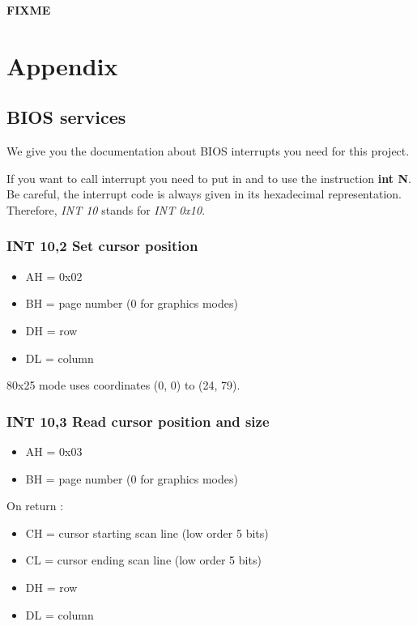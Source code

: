 \textbf{FIXME}


%
%

\chapter{Appendix}

%
%

\section{BIOS services}

We give you the documentation about BIOS interrupts you need for this
project.

If you want to call interrupt  you need to put  in
 and to use the instruction \textbf{int N}. Be careful, the
interrupt code is always given in its hexadecimal representation. Therefore,
\emph{INT 10} stands for \emph{INT 0x10}.

%
%
\subsection{INT 10,2 Set cursor position}
\begin{itemize}
  \item{AH = 0x02}
  \item{BH = page number (0 for graphics modes)}
  \item{DH = row}
  \item{DL = column}
\end{itemize}

80x25 mode uses coordinates (0, 0) to (24, 79).

\subsection{INT 10,3 Read cursor position and size}
\begin{itemize}
  \item{AH = 0x03}
  \item{BH = page number (0 for graphics modes)}
\end{itemize}

On return :

\begin{itemize}
  \item{CH = cursor starting scan line (low order 5 bits)}
  \item{CL = cursor ending scan line (low order 5 bits)}
  \item{DH = row}
  \item{DL = column}
\end{itemize}


